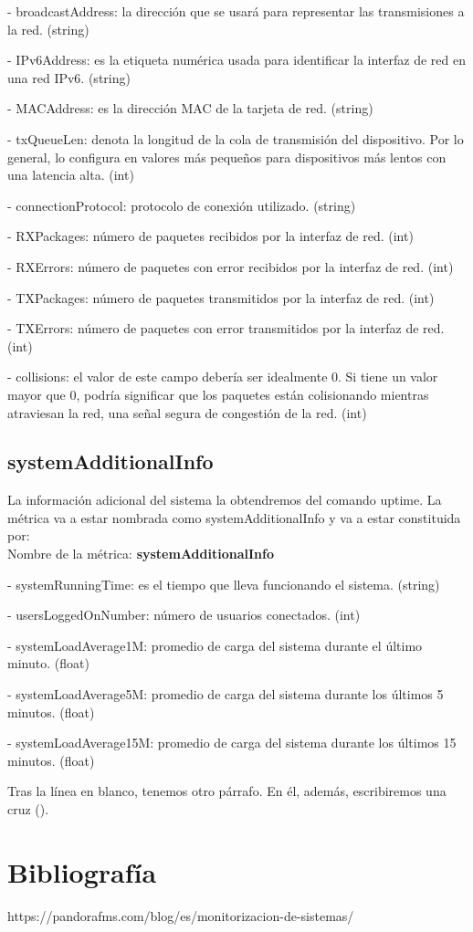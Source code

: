 \documentclass[ spanish, a4paper, 12pt, twoside]{report}
\begin{document}
\hyp{} broadcastAddress: la dirección que se usará para representar las transmisiones a la red. (string)

\hyp{} IPv6Address: es la etiqueta numérica usada para identificar la interfaz de red en una red IPv6. (string)

\hyp{} MACAddress: es la dirección MAC de la tarjeta de red. (string)

\hyp{} txQueueLen: denota la longitud de la cola de transmisión del dispositivo. Por lo general, lo configura en valores más pequeños 
para dispositivos más lentos con una latencia alta. (int)

\hyp{} connectionProtocol: protocolo de conexión utilizado. (string)

\hyp{} RXPackages: número de paquetes recibidos por la interfaz de red. (int)

\hyp{} RXErrors: número de paquetes con error recibidos por la interfaz de red. (int)

\hyp{} TXPackages: número de paquetes transmitidos por la interfaz de red. (int)

\hyp{} TXErrors: número de paquetes con error transmitidos por la interfaz de red. (int)

\hyp{} collisions: el valor de este campo debería ser idealmente 0. Si tiene un valor mayor que 0, podría significar que los paquetes
están colisionando mientras atraviesan la red, una señal segura de congestión de la red. (int)

\section{systemAdditionalInfo}
La información adicional del sistema la obtendremos del comando uptime.
La métrica va a estar nombrada como systemAdditionalInfo y va a estar constituida por:\\
  
Nombre de la métrica: \textbf{systemAdditionalInfo}

\hyp{} systemRunningTime: es el tiempo que lleva funcionando el sistema. (string)

\hyp{} usersLoggedOnNumber: número de usuarios conectados. (int)

\hyp{} systemLoadAverage1M: promedio de carga del sistema durante el último minuto. (float)

\hyp{} systemLoadAverage5M: promedio de carga del sistema durante los últimos 5 minutos. (float)

\hyp{} systemLoadAverage15M: promedio de carga del sistema durante los últimos 15 minutos. (float)

Tras la línea en blanco, tenemos otro párrafo. En
él, además, escribiremos una cruz (\textdagger{}).

\chapter{Bibliografía}
https://pandorafms.com/blog/es/monitorizacion-de-sistemas/
\end{document}
